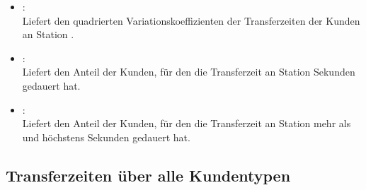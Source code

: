 \begin{itemize}
\item
{}:\\
Liefert den quadrierten Variationskoeffizienten der Transferzeiten der Kunden an Station .

\item
{}:\\
Liefert den Anteil der Kunden, für den die Transferzeit an Station   Sekunden gedauert hat.

\item
{}:\\
Liefert den Anteil der Kunden, für den die Transferzeit an Station  mehr als  und höchstens  Sekunden gedauert hat.

\end{itemize}  



\subsection{Transferzeiten über alle Kundentypen}

